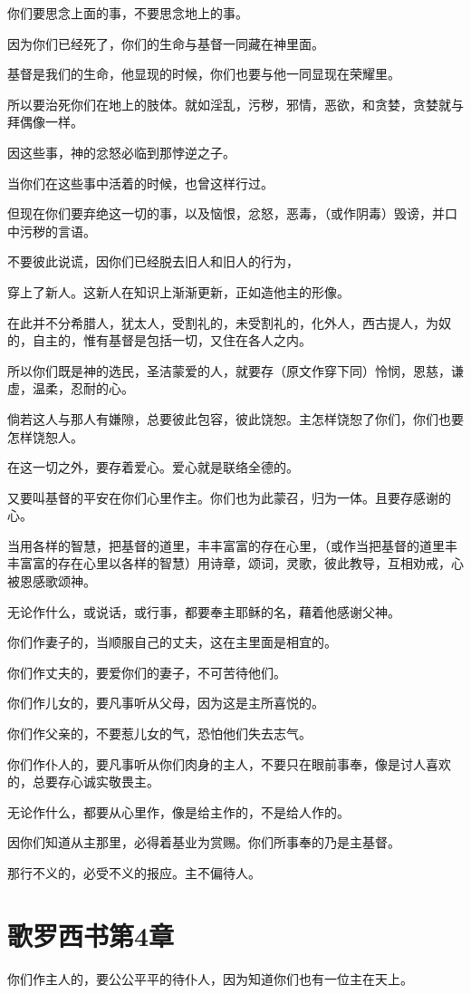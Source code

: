 \documentclass[12pt,oneside]{book}
\begin{document}
你们要思念上面的事，不要思念地上的事。

因为你们已经死了，你们的生命与基督一同藏在神里面。

基督是我们的生命，他显现的时候，你们也要与他一同显现在荣耀里。

所以要治死你们在地上的肢体。就如淫乱，污秽，邪情，恶欲，和贪婪，贪婪就与拜偶像一样。

因这些事，神的忿怒必临到那悖逆之子。

当你们在这些事中活着的时候，也曾这样行过。

但现在你们要弃绝这一切的事，以及恼恨，忿怒，恶毒，（或作阴毒）毁谤，并口中污秽的言语。

不要彼此说谎，因你们已经脱去旧人和旧人的行为，

穿上了新人。这新人在知识上渐渐更新，正如造他主的形像。

在此并不分希腊人，犹太人，受割礼的，未受割礼的，化外人，西古提人，为奴的，自主的，惟有基督是包括一切，又住在各人之内。

所以你们既是神的选民，圣洁蒙爱的人，就要存（原文作穿下同）怜悯，恩慈，谦虚，温柔，忍耐的心。

倘若这人与那人有嫌隙，总要彼此包容，彼此饶恕。主怎样饶恕了你们，你们也要怎样饶恕人。

在这一切之外，要存着爱心。爱心就是联络全德的。

又要叫基督的平安在你们心里作主。你们也为此蒙召，归为一体。且要存感谢的心。

当用各样的智慧，把基督的道里，丰丰富富的存在心里，（或作当把基督的道里丰丰富富的存在心里以各样的智慧）用诗章，颂词，灵歌，彼此教导，互相劝戒，心被恩感歌颂神。

无论作什么，或说话，或行事，都要奉主耶稣的名，藉着他感谢父神。

你们作妻子的，当顺服自己的丈夫，这在主里面是相宜的。

你们作丈夫的，要爱你们的妻子，不可苦待他们。

你们作儿女的，要凡事听从父母，因为这是主所喜悦的。

你们作父亲的，不要惹儿女的气，恐怕他们失去志气。

你们作仆人的，要凡事听从你们肉身的主人，不要只在眼前事奉，像是讨人喜欢的，总要存心诚实敬畏主。

无论作什么，都要从心里作，像是给主作的，不是给人作的。

因你们知道从主那里，必得着基业为赏赐。你们所事奉的乃是主基督。

那行不义的，必受不义的报应。主不偏待人。

\chapter{歌罗西书第4章}
你们作主人的，要公公平平的待仆人，因为知道你们也有一位主在天上。
\end{document}
